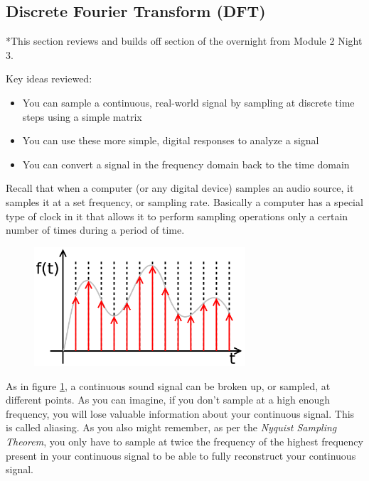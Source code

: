 \documentclass{tufte-handout}
\begin{document}
\subsection{Discrete Fourier Transform (DFT)}
*This section reviews and builds off section of the overnight from Module 2 Night 3.

Key ideas reviewed:
\begin{itemize}
	\item You can sample a continuous, real-world signal by sampling at discrete time steps using a simple matrix
	\item You can use these more simple, digital responses to analyze a signal
	\item You can convert a signal in the frequency domain back to the time domain
\end{itemize}

Recall that when a computer (or any digital device) samples an audio source, it samples it at a set frequency, or sampling rate. Basically a computer has a special type of clock in it that allows it to perform sampling operations only a certain number of times during a period of time. 

\begin{figure}
	\centering 
	\includegraphics[width=0.7\textwidth]{discrete_time.png}
	\caption{}
	\label{fig:discrete_time}
 \end{figure}

As in figure \ref{fig:discrete_time}, a continuous sound signal can be broken up, or sampled, at different points. As you can imagine, if you don't sample at a high enough frequency, you will lose valuable information about your continuous signal. This is called aliasing. As you also might remember, as per the \textit{Nyquist Sampling Theorem}, you only have to sample at twice the frequency of the highest frequency present in your continuous signal to be able to fully reconstruct your continuous signal. 
\end{document}
